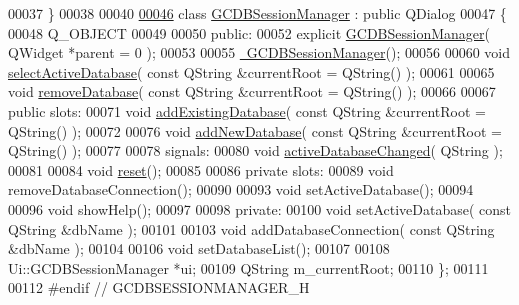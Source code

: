 \begin{DoxyCode}
00037 \}
00038 
00040 
\hypertarget{gcdbsessionmanager_8h_source_l00046}{}\hyperlink{class_g_c_d_b_session_manager}{00046} \textcolor{keyword}{class }\hyperlink{class_g_c_d_b_session_manager}{GCDBSessionManager} : \textcolor{keyword}{public} QDialog
00047 \{
00048   Q\_OBJECT
00049   
00050 \textcolor{keyword}{public}:
00052   \textcolor{keyword}{explicit} \hyperlink{class_g_c_d_b_session_manager_ae9bbc80ab3d7235f804393ea1b4e9f36}{GCDBSessionManager}( QWidget *parent = 0 );
00053 
00055   \hyperlink{class_g_c_d_b_session_manager_a95698026afd73f32557483f3fc19b419}{~GCDBSessionManager}();
00056 
00060   \textcolor{keywordtype}{void} \hyperlink{class_g_c_d_b_session_manager_ac4e5a25619ee77bc9307d3428bfd345d}{selectActiveDatabase}(  \textcolor{keyword}{const} QString &currentRoot = QString() );
00061 
00065   \textcolor{keywordtype}{void} \hyperlink{class_g_c_d_b_session_manager_a0fc44e9d2efb407cc0964295920b2432}{removeDatabase}( \textcolor{keyword}{const} QString &currentRoot = QString() );
00066 
00067 \textcolor{keyword}{public} slots:
00071   \textcolor{keywordtype}{void} \hyperlink{class_g_c_d_b_session_manager_a52f3407b7ad5cac7c8c422d2528b28fc}{addExistingDatabase}( \textcolor{keyword}{const} QString &currentRoot = QString() );
00072 
00076   \textcolor{keywordtype}{void} \hyperlink{class_g_c_d_b_session_manager_ad029ca4ec8ffff788a281f1b3f3eee71}{addNewDatabase}( \textcolor{keyword}{const} QString &currentRoot = QString() );
00077 
00078 signals:
00080   \textcolor{keywordtype}{void} \hyperlink{class_g_c_d_b_session_manager_a47338631e494645f867544a719825311}{activeDatabaseChanged}( QString );
00081 
00084   \textcolor{keywordtype}{void} \hyperlink{class_g_c_d_b_session_manager_add2dc0347405ffb60c4ba057009ead46}{reset}();
00085 
00086 \textcolor{keyword}{private} slots:
00089   \textcolor{keywordtype}{void} removeDatabaseConnection();
00090 
00093   \textcolor{keywordtype}{void} setActiveDatabase();
00094 
00096   \textcolor{keywordtype}{void} showHelp();
00097 
00098 \textcolor{keyword}{private}:
00100   \textcolor{keywordtype}{void} setActiveDatabase( \textcolor{keyword}{const} QString &dbName );
00101 
00103   \textcolor{keywordtype}{void} addDatabaseConnection( \textcolor{keyword}{const} QString &dbName );
00104 
00106   \textcolor{keywordtype}{void} setDatabaseList();
00107   
00108   Ui::GCDBSessionManager *ui;
00109   QString  m\_currentRoot;
00110 \};
00111 
00112 \textcolor{preprocessor}{#endif // GCDBSESSIONMANAGER\_H}
\end{DoxyCode}
